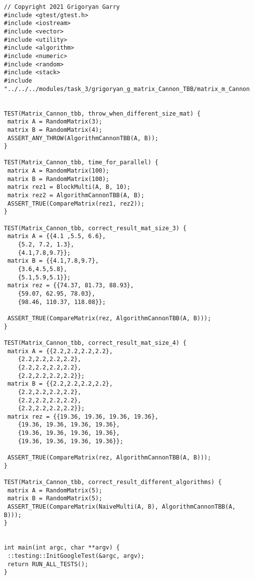 \documentclass{report}
\begin{document}
\begin{lstlisting}
// Copyright 2021 Grigoryan Garry
#include <gtest/gtest.h>
#include <iostream>
#include <vector>
#include <utility>
#include <algorithm>
#include <numeric>
#include <random>
#include <stack>
#include "../../../modules/task_3/grigoryan_g_matrix_Cannon_TBB/matrix_m_Cannon.h"


TEST(Matrix_Cannon_tbb, throw_when_different_size_mat) {
 matrix A = RandomMatrix(3);
 matrix B = RandomMatrix(4);
 ASSERT_ANY_THROW(AlgorithmCannonTBB(A, B));
}

TEST(Matrix_Cannon_tbb, time_for_parallel) {
 matrix A = RandomMatrix(100);
 matrix B = RandomMatrix(100);
 matrix rez1 = BlockMulti(A, B, 10); 
 matrix rez2 = AlgorithmCannonTBB(A, B);
 ASSERT_TRUE(CompareMatrix(rez1, rez2));
}

TEST(Matrix_Cannon_tbb, correct_result_mat_size_3) {
 matrix A = {{4.1 ,5.5, 6.6},
    {5.2, 7.2, 1.3},
    {4.1,7.8,9.7}};
 matrix B = {{4.1,7.8,9.7},
    {3.6,4.5,5.8},
    {5.1,5.9,5.1}};
 matrix rez = {{74.37, 81.73, 88.93},
    {59.07, 62.95, 78.03},
    {98.46, 110.37, 118.08}};

 ASSERT_TRUE(CompareMatrix(rez, AlgorithmCannonTBB(A, B)));
}

TEST(Matrix_Cannon_tbb, correct_result_mat_size_4) {
 matrix A = {{2.2,2.2,2.2,2.2},
    {2.2,2.2,2.2,2.2},
    {2.2,2.2,2.2,2.2},
    {2.2,2.2,2.2,2.2}};
 matrix B = {{2.2,2.2,2.2,2.2},
    {2.2,2.2,2.2,2.2},
    {2.2,2.2,2.2,2.2},
    {2.2,2.2,2.2,2.2}};
 matrix rez = {{19.36, 19.36, 19.36, 19.36},
    {19.36, 19.36, 19.36, 19.36},
    {19.36, 19.36, 19.36, 19.36},
    {19.36, 19.36, 19.36, 19.36}};

 ASSERT_TRUE(CompareMatrix(rez, AlgorithmCannonTBB(A, B)));
}

TEST(Matrix_Cannon_tbb, correct_result_different_algorithms) {
 matrix A = RandomMatrix(5);
 matrix B = RandomMatrix(5);
 ASSERT_TRUE(CompareMatrix(NaiveMulti(A, B), AlgorithmCannonTBB(A, B)));
}


int main(int argc, char **argv) {
 ::testing::InitGoogleTest(&argc, argv);
 return RUN_ALL_TESTS();
}
\end{lstlisting}
\end{document}

